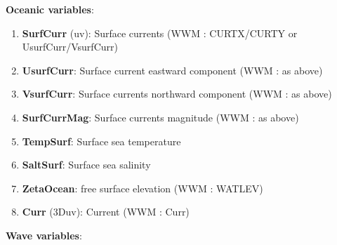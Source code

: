 \documentclass[12pt]{amsart}
\begin{document}
{\bf Oceanic variables}:
\begin{enumerate}
\item {\bf SurfCurr} (uv): Surface currents (WWM : CURTX/CURTY or UsurfCurr/VsurfCurr)
\item {\bf UsurfCurr}: Surface current eastward component (WWM : as above)
\item {\bf VsurfCurr}: Surface currents northward component (WWM : as above)
\item {\bf SurfCurrMag}: Surface currents magnitude (WWM : as above)
\item {\bf TempSurf}: Surface sea temperature
\item {\bf SaltSurf}: Surface sea salinity
\item {\bf ZetaOcean}: free surface elevation (WWM : WATLEV)
\item {\bf Curr} (3Duv): Current (WWM : Curr)
\end{enumerate}
{\bf Wave variables}:
\end{document}
